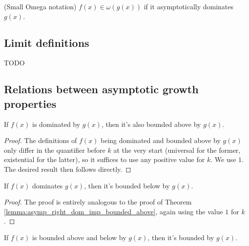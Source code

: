 \begin{definition}(Small Omega notation)
    \label{def:small_omega}
    \leanok
    $f(x) \in \omega(g(x))$ if it asymptotically dominates $g(x)$.
\end{definition}


\subsection{Limit definitions}

TODO


\subsection{Relations between asymptotic growth properties}

\begin{lemma}
    \label{lemma:asymp_right_dom_imp_bounded_above}
    \leanok
    If $f(x)$ is dominated by $g(x)$, then it's also bounded above by $g(x)$.
\end{lemma}

\begin{proof}
    \leanok 
    The definitions of $f(x)$ being dominated and bounded above by $g(x)$ only differ
    in the quantifier before $k$ at the very start (universal for the former, existential
    for the latter), so it suffices to use any positive value for $k$. We use $1$. 
    The desired result then follows directly.
\end{proof}

\begin{lemma}
    \label{lemma:asymp_left_dom_imp_bounded_below}
    \leanok
    If $f(x)$ dominates $g(x)$, then it's bounded below by $g(x)$.
\end{lemma}

\begin{proof}
    \leanok
    The proof is entirely analogous to the proof of Theorem 
    \ref{lemma:asymp_right_dom_imp_bounded_above}, again using the value 
    $1$ for $k$.
\end{proof}

\begin{theorem}
    \label{thm:asymp_bounded_above_below_iff_bounded}
    \leanok
    If $f(x)$ is bounded above and below by $g(x)$, then it's bounded by $g(x)$.
\end{theorem}

